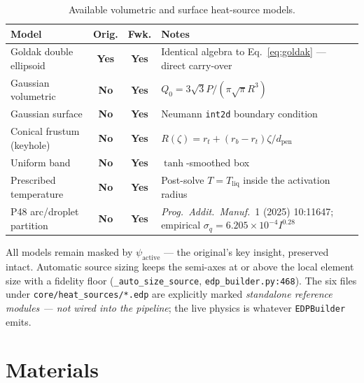 \documentclass[10pt,a4paper]{article}
\newcommand{\yes}{\textcolor{blue!55!black}{\textbf{Yes}}}
\newcommand{\no}{\textcolor{red!60!black}{\textbf{No}}}
\newcommand{\code}[1]{\texttt{#1}}
\newcommand{\file}[1]{\texttt{\small #1}}
\begin{document}
\begin{table}[h!]
\centering
\caption{Available volumetric and surface heat-source models.}
\label{tab:src}
\small
\begin{tabularx}{\linewidth}{@{}l c c X@{}}
\toprule
\textbf{Model} & \textbf{Orig.} & \textbf{Fwk.} & \textbf{Notes} \\
\midrule
Goldak double ellipsoid & \yes & \yes & Identical algebra to
Eq.~\eqref{eq:goldak} --- direct carry-over \\
Gaussian volumetric & \no & \yes & $Q_0 = 3\sqrt{3}P/(\pi\sqrt{\pi}R^3)$ \\
Gaussian surface & \no & \yes & Neumann \code{int2d} boundary condition \\
Conical frustum (keyhole) & \no & \yes & $R(\zeta) = r_t + (r_b - r_t)\zeta/d_{\text{pen}}$ \\
Uniform band & \no & \yes & $\tanh$-smoothed box \\
Prescribed temperature & \no & \yes & Post-solve $T = T_{\text{liq}}$ inside the activation radius \\
P48 arc/droplet partition & \no & \yes & \emph{Prog.\ Addit.\ Manuf.}\ 1 (2025) 10:11647; empirical $\sigma_q = 6.205\times10^{-4} I^{0.28}$ \\
\bottomrule
\end{tabularx}
\end{table}

\noindent All models remain masked by $\psi_{\text{active}}$ --- the original's
key insight, preserved intact. Automatic source sizing keeps the semi-axes at or
above the local element size with a fidelity floor
(\code{\_auto\_size\_source}, \file{edp\_builder.py:468}). The six files under
\code{core/heat\_sources/*.edp} are explicitly marked \emph{standalone reference
modules --- not wired into the pipeline}; the live physics is whatever
\code{EDPBuilder} emits.

\section{Materials}
\end{document}
